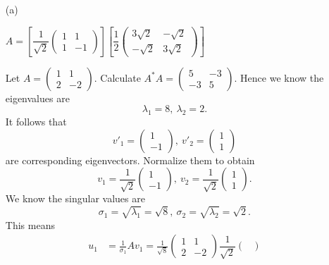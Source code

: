 \begin{Exercise}
	\begin{enumerate}[(a)]
		\item[(a)]
		\begin{answer}
			$A = \left[ \dfrac{1}{\sqrt{2}}\begin{pmatrix}
			1 & 1 \\
			1 & -1
			\end{pmatrix} \right] \left[ \dfrac{1}{2} \begin{pmatrix}
			3\sqrt{2} & -\sqrt{2} \\
			-\sqrt{2} & 3\sqrt{2}
			\end{pmatrix} \right]$
		\end{answer}
		\begin{solution}
			Let $A = \begin{pmatrix}
			1 & 1 \\
			2 & -2
			\end{pmatrix}$.
			Calculate $A^* A = \begin{pmatrix}
			5 & -3 \\
			-3 & 5
			\end{pmatrix}$.
			Hence we know the eigenvalues are
			$$
			\lambda_1 = 8,~ \lambda_2 = 2.
			$$
			It follows that
			$$
			v'_1 = \begin{pmatrix}
			1 \\
			-1
			\end{pmatrix},~ v'_2 = \begin{pmatrix}
			1 \\
			1
			\end{pmatrix}
			$$
			are corresponding eigenvectors.
			Normalize them to obtain
			$$
			v_1 = \dfrac{1}{\sqrt{2}}\begin{pmatrix}
			1 \\
			-1
			\end{pmatrix},~ v_2 = \dfrac{1}{\sqrt{2}}\begin{pmatrix}
			1 \\
			1
			\end{pmatrix}.
			$$
			We know the singular values are
			$$
			\sigma_1 = \sqrt{\lambda_1} = \sqrt{8},~
			\sigma_2 = \sqrt{\lambda_2} = \sqrt{2}.
			$$
			This means
			\begin{align*}
			u_1 
			&= \frac{1}{\sigma_1}A v_1 = \frac{1}{\sqrt{8}} \begin{pmatrix}
			1 & 1 \\
			2 & -2
			\end{pmatrix} \dfrac{1}{\sqrt{2}}\begin{pmatrix}

\end{pmatrix}
\end{align*}
\end{solution}
\end{enumerate}
\end{Exercise}
